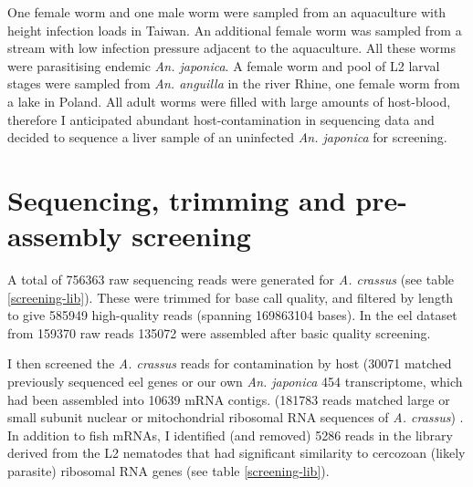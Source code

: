 One female worm and one male worm were sampled from an aquaculture
with height infection loads in Taiwan. An additional female worm was
sampled from a stream with low infection pressure adjacent to the
aquaculture. All these worms were parasitising endemic
\textit{An. japonica}. A female worm and pool of L2 larval stages were
sampled from \textit{An. anguilla} in the river Rhine, one female worm
from a lake in Poland. All adult worms were filled with large amounts
of host-blood, therefore I anticipated abundant host-contamination in
sequencing data and decided to sequence a liver sample of an
uninfected \textit{An. japonica} for screening.

\section{Sequencing, trimming and pre-assembly screening}

A total of 756363 raw sequencing reads were generated for
\textit{A. crassus} (see table \ref{screening-lib}). These were
trimmed for base call quality, and filtered by length to give 585949
high-quality reads (spanning 169863104 bases). In the eel dataset from
159370 raw reads 135072 were assembled after basic quality screening.

I then screened the \textit{A. crassus} reads for contamination by
host (30071 matched previously sequenced eel genes or our own
\textit{An. japonica} 454 transcriptome, which had been assembled into
10639 mRNA contigs. (181783 reads matched large or small subunit
nuclear or mitochondrial ribosomal RNA sequences of
\textit{A. crassus}) . In addition to fish mRNAs, I identified (and
removed) 5286 reads in the library derived from the L2 nematodes that
had significant similarity to cercozoan (likely parasite) ribosomal
RNA genes (see table \ref{screening-lib}). 


